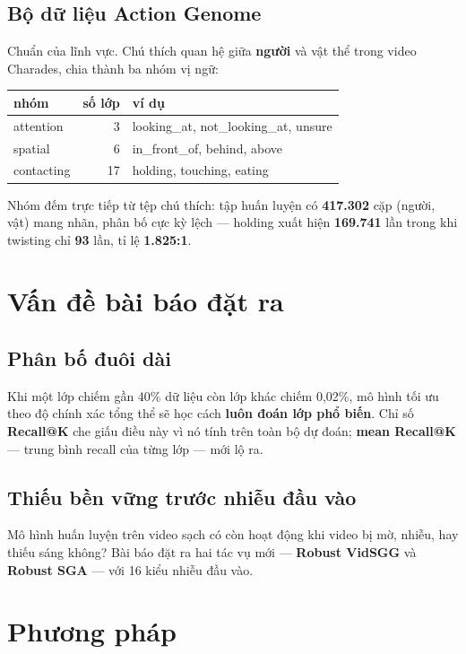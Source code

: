 \documentclass[11pt,a4paper]{article}
\newcommand{\code}[1]{{\ttfamily\small\color{codetext}#1}}
\begin{document}
\subsection{Bộ dữ liệu Action Genome}
Chuẩn của lĩnh vực. Chú thích quan hệ giữa \textbf{người} và vật thể trong video Charades, chia thành ba nhóm vị ngữ:

\begin{center}\small
\begin{tabular}{@{}lrl@{}}
\toprule
\textbf{nhóm} & \textbf{số lớp} & \textbf{ví dụ}\\
\midrule
attention & 3 & \code{looking\_at}, \code{not\_looking\_at}, \code{unsure}\\
spatial & 6 & \code{in\_front\_of}, \code{behind}, \code{above}\\
contacting & 17 & \code{holding}, \code{touching}, \code{eating}\\
\bottomrule
\end{tabular}
\end{center}
Nhóm đếm trực tiếp từ tệp chú thích: tập huấn luyện có \textbf{417.302} cặp (người, vật) mang nhãn, phân bố cực kỳ lệch --- \code{holding} xuất hiện \textbf{169.741} lần trong khi \code{twisting} chỉ \textbf{93} lần, tỉ lệ \textbf{1.825:1}.

\section{Vấn đề bài báo đặt ra}
\subsection{Phân bố đuôi dài}
Khi một lớp chiếm gần 40\% dữ liệu còn lớp khác chiếm 0,02\%, mô hình tối ưu theo độ chính xác tổng thể sẽ học cách \textbf{luôn đoán lớp phổ biến}. Chỉ số \textbf{Recall@K} che giấu điều này vì nó tính trên toàn bộ dự đoán; \textbf{mean Recall@K} --- trung bình recall của từng lớp --- mới lộ ra.

\subsection{Thiếu bền vững trước nhiễu đầu vào}
Mô hình huấn luyện trên video sạch có còn hoạt động khi video bị mờ, nhiễu, hay thiếu sáng không? Bài báo đặt ra hai tác vụ mới --- \textbf{Robust VidSGG} và \textbf{Robust SGA} --- với 16 kiểu nhiễu đầu vào.

\section{Phương pháp}
\end{document}
